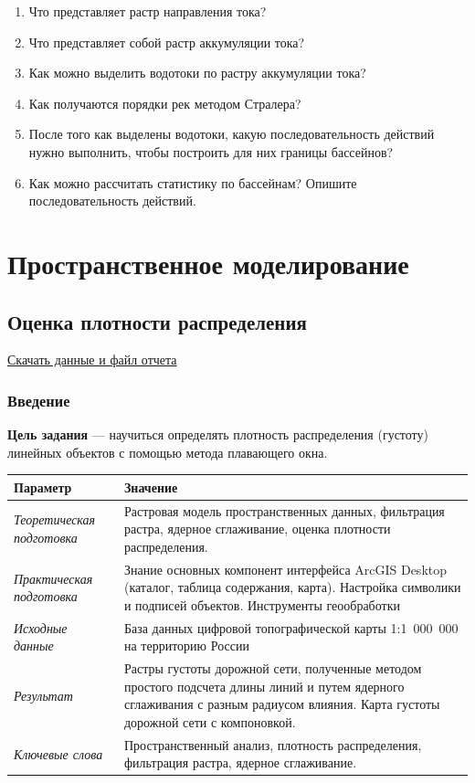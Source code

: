 \documentclass[]{book}
\theoremstyle{definition}
\theoremstyle{definition}
\theoremstyle{definition}
\theoremstyle{remark}
\begin{document}
\begin{enumerate}
\def\labelenumi{\arabic{enumi}.}
\item
  Что представляет растр направления тока?
\item
  Что представляет собой растр аккумуляции тока?
\item
  Как можно выделить водотоки по растру аккумуляции тока?
\item
  Как получаются порядки рек методом Стралера?
\item
  После того как выделены водотоки, какую последовательность действий
  нужно выполнить, чтобы построить для них границы бассейнов?
\item
  Как можно рассчитать статистику по бассейнам? Опишите
  последовательность действий.
\end{enumerate}

\hypertarget{part--}{%
\part{Пространственное моделирование}\label{part--}}

\hypertarget{density-analysis}{%
\chapter{Оценка плотности распределения}\label{density-analysis}}

\href{http://autolab.geogr.msu.ru/gis/data/Ex16.zip}{Скачать данные и
файл отчета}

\hypertarget{density-analysis-intro}{%
\section{Введение}\label{density-analysis-intro}}

\textbf{Цель задания} --- научиться определять плотность распределения
(густоту) линейных объектов с помощью метода плавающего окна.

\begin{longtable}[]{@{}ll@{}}
\toprule
Параметр & Значение\tabularnewline
\midrule
\endhead
\emph{Теоретическая подготовка} & Растровая модель пространственных
данных, фильтрация растра, ядерное сглаживание, оценка плотности
распределения.\tabularnewline
\emph{Практическая подготовка} & Знание основных компонент интерфейса
ArcGIS Desktop (каталог, таблица содержания, карта). Настройка символики
и подписей объектов. Инструменты геообработки\tabularnewline
\emph{Исходные данные} & База данных цифровой топографической карты
1:1~000~000 на территорию России\tabularnewline
\emph{Результат} & Растры густоты дорожной сети, полученные методом
простого подсчета длины линий и путем ядерного сглаживания с разным
радиусом влияния. Карта густоты дорожной сети с
компоновкой.\tabularnewline
\emph{Ключевые слова} & Пространственный анализ, плотность
распределения, фильтрация растра, ядерное сглаживание.\tabularnewline
\bottomrule
\end{longtable}
\end{document}

